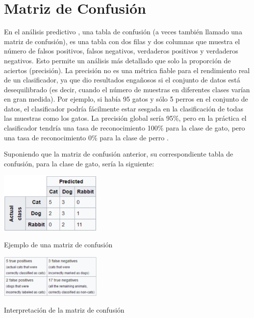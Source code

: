 \section{Matriz de Confusión}
En el análisis predictivo , una tabla de confusión (a veces también llamado
una matriz de confusión), es una tabla con dos filas y dos columnas que muestra el número
de falsos positivos, falsos negativos, verdaderos positivos y verdaderos negativos. Esto
permite un análisis más detallado que solo la proporción de aciertos (precisión). La
precisión no es una métrica fiable para el rendimiento real de un clasificador, ya que dio
resultados engañosos si el conjunto de datos está desequilibrado (es decir, cuando el
número de muestras en diferentes clases varían en gran medida). Por ejemplo, si había 95
gatos y sólo 5 perros en el conjunto de datos, el clasificador podría fácilmente estar
sesgada en la clasificación de todas las muestras como los gatos. La precisión global sería 95\%, pero en la práctica el clasificador tendría una tasa de reconocimiento 100\% para la
clase de gato, pero una tasa de reconocimiento 0\% para la clase de perro \cite{30Mconfusion}.

Suponiendo que la matriz de confusión anterior, su correspondiente tabla de
confusión, para la clase de gato, sería la siguiente:

\begin{table}[!htb]
    \centering
    \includegraphics[width=50mm]{Imagenes/matriz_confusion.png}
    \caption{Ejemplo de una matriz de confusión}
    \label{tab:matriz_confusion}
   \vspace{0.5cm}
    \includegraphics[width=50mm]{Imagenes/interpretacion_matriz_confusion.png}
    \caption{Interpretación de la matriz de confusión}
    \label{tab:inter_matriz_confusion}
    
\end{table}




